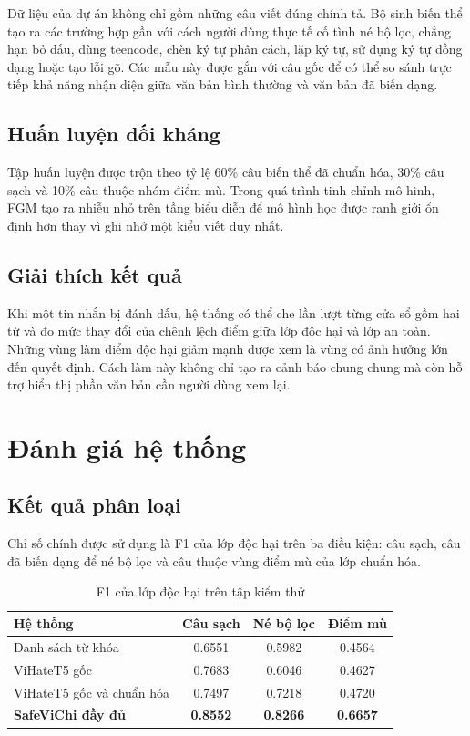 \documentclass[12pt,a4paper]{article}
\begin{document}
Dữ liệu của dự án không chỉ gồm những câu viết đúng chính tả. Bộ sinh biến thể tạo ra các trường hợp gần với cách người dùng thực tế cố tình né bộ lọc, chẳng hạn bỏ dấu, dùng teencode, chèn ký tự phân cách, lặp ký tự, sử dụng ký tự đồng dạng hoặc tạo lỗi gõ. Các mẫu này được gắn với câu gốc để có thể so sánh trực tiếp khả năng nhận diện giữa văn bản bình thường và văn bản đã biến dạng.

\subsection{Huấn luyện đối kháng}

Tập huấn luyện được trộn theo tỷ lệ 60\% câu biến thể đã chuẩn hóa, 30\% câu sạch và 10\% câu thuộc nhóm điểm mù. Trong quá trình tinh chỉnh mô hình, FGM tạo ra nhiễu nhỏ trên tầng biểu diễn để mô hình học được ranh giới ổn định hơn thay vì ghi nhớ một kiểu viết duy nhất.

\subsection{Giải thích kết quả}

Khi một tin nhắn bị đánh dấu, hệ thống có thể che lần lượt từng cửa sổ gồm hai từ và đo mức thay đổi của chênh lệch điểm giữa lớp độc hại và lớp an toàn. Những vùng làm điểm độc hại giảm mạnh được xem là vùng có ảnh hưởng lớn đến quyết định. Cách làm này không chỉ tạo ra cảnh báo chung chung mà còn hỗ trợ hiển thị phần văn bản cần người dùng xem lại.

\section{Đánh giá hệ thống}

\subsection{Kết quả phân loại}

Chỉ số chính được sử dụng là F1 của lớp độc hại trên ba điều kiện: câu sạch, câu đã biến dạng để né bộ lọc và câu thuộc vùng điểm mù của lớp chuẩn hóa.

\begin{table}[H]
    \centering
    \caption{F1 của lớp độc hại trên tập kiểm thử}
    \begin{tabular}{lccc}
        \toprule
        Hệ thống & Câu sạch & Né bộ lọc & Điểm mù \\
        \midrule
        Danh sách từ khóa & 0.6551 & 0.5982 & 0.4564 \\
        ViHateT5 gốc & 0.7683 & 0.6046 & 0.4627 \\
        ViHateT5 gốc và chuẩn hóa & 0.7497 & 0.7218 & 0.4720 \\
        \textbf{SafeViChi đầy đủ} & \textbf{0.8552} & \textbf{0.8266} & \textbf{0.6657} \\
        \bottomrule
    \end{tabular}
\end{table}
\end{document}
